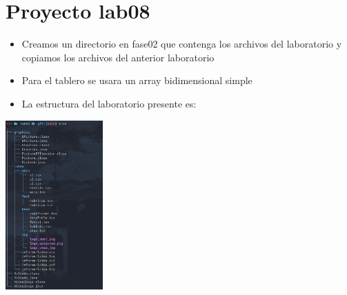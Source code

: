 \section{Proyecto lab08}
\begin{itemize}
  \item Creamos un directorio en fase02 que contenga los archivos del laboratorio y copiamos los archivos del anterior laboratorio
  \item Para el tablero se usara un array bidimensional simple
  \item La estructura del laboratorio presente es:
\end{itemize}
\includegraphics[width=0.28\textwidth]{img/tree.jpg}
